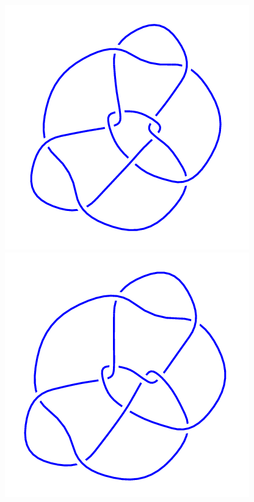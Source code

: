 \begin{figure}[H]
\begin{minipage}[b]{.18\linewidth}
    \end{minipage}
    \begin{minipage}[b]{.18\linewidth}
        \centering
        \includegraphics[width=\linewidth]{../data/10_109.png}
    \end{minipage}
    \begin{minipage}[b]{.18\linewidth}
        \centering
        \includegraphics[width=\linewidth]{../data/10_110.png}

\end{minipage}
\end{figure}
